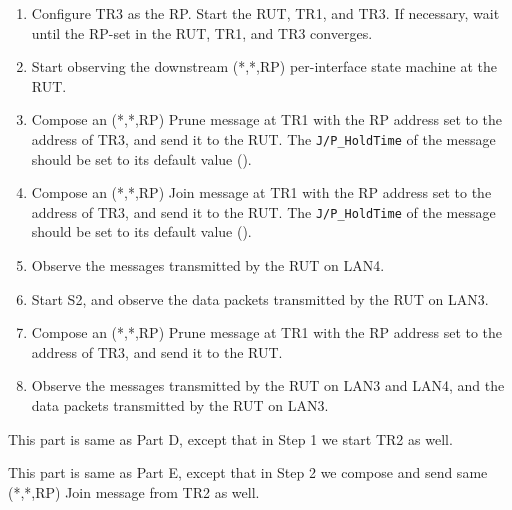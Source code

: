 \documentclass[11pt]{report}
\begin{document}
\begin{enumerate}

  \item Configure TR3 as the RP. Start the RUT, TR1, and TR3. If
  necessary, wait until the RP-set in the RUT, TR1, and TR3
  converges.

  \item Start observing the downstream (*,*,RP) per-interface state
  machine at the RUT.

  \item Compose an (*,*,RP) Prune message at TR1 with the RP address set
  to the address of TR3, and send it to the RUT.
  The \verb=J/P_HoldTime= of the message should be set to its default
  value ({\PimsmJPHoldTime}).

  \item Compose an (*,*,RP) Join message at TR1 with the RP address set
  to the address of TR3, and send it to the RUT.
  The \verb=J/P_HoldTime= of the message should be set to its default
  value ({\PimsmJPHoldTime}).

  \item Observe the messages transmitted by the RUT on LAN4.

  \item Start S2, and observe the data packets transmitted by the RUT on
  LAN3.

  \item Compose an (*,*,RP) Prune message at TR1 with the RP address set
  to the address of TR3, and send it to the RUT.

  \item Observe the messages transmitted by the RUT on LAN3 and LAN4,
  and the data packets transmitted by the RUT on LAN3.

\end{enumerate}


This part is same as Part D, except that in Step 1 we start TR2 as well.


This part is same as Part E, except that in Step 2 we compose and send
same (*,*,RP) Join message from TR2 as well.


\end{document}
